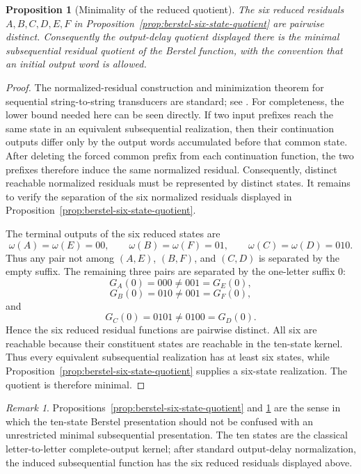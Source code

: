 \documentclass[11pt,letterpaper]{article}
\numberwithin{equation}{section}
\theoremstyle{plain}
\newtheorem{proposition}[theorem]{Proposition}
\theoremstyle{definition}
\theoremstyle{remark}
\newtheorem{remark}[theorem]{Remark}
\begin{document}
\begin{proposition}[Minimality of the reduced quotient]\label{prop:berstel-six-state-minimal}
The six reduced residuals $A,B,C,D,E,F$ in
Proposition~\ref{prop:berstel-six-state-quotient} are pairwise distinct.
Consequently the output-delay quotient displayed there is the minimal
subsequential residual quotient of the Berstel function, with the convention
that an initial output word is allowed.
\end{proposition}

\begin{proof}
The normalized-residual construction and minimization theorem for sequential
string-to-string transducers are standard; see
\cite{Mohri1994MinimizationSequentialTransducers}.  For completeness, the
lower bound needed here can be seen directly.  If two input prefixes reach the
same state in an equivalent subsequential realization, then their continuation
outputs differ only by the output words accumulated before that common state.
After deleting the forced common prefix from each continuation function, the
two prefixes therefore induce the same normalized residual.  Consequently,
distinct reachable normalized residuals must be represented by distinct
states.  It remains to verify the separation of the six normalized residuals
displayed in Proposition~\ref{prop:berstel-six-state-quotient}.

The terminal outputs of the six reduced states are
\[
\omega(A)=\omega(E)=00,\qquad
\omega(B)=\omega(F)=01,\qquad
\omega(C)=\omega(D)=010.
\]
Thus any pair not among $(A,E)$, $(B,F)$, and $(C,D)$ is separated by the
empty suffix.  The remaining three pairs are separated by the one-letter
suffix $0$:
\[
G_A(0)=000 \neq 001=G_E(0),
\]
\[
G_B(0)=010 \neq 001=G_F(0),
\]
and
\[
G_C(0)=0101 \neq 0100=G_D(0).
\]
Hence the six reduced residual functions are pairwise distinct.  All six are
reachable because their constituent states are reachable in the ten-state
kernel.  Thus every equivalent subsequential realization has at least six
states, while Proposition~\ref{prop:berstel-six-state-quotient} supplies a
six-state realization.  The quotient is therefore minimal.
\end{proof}

\begin{remark}
Propositions~\ref{prop:berstel-six-state-quotient} and
\ref{prop:berstel-six-state-minimal} are the sense in which the
ten-state Berstel presentation should not be confused with an unrestricted
minimal subsequential presentation.  The ten states are the classical
letter-to-letter complete-output kernel; after standard output-delay
normalization, the induced subsequential function has the six reduced
residuals displayed above.
\end{remark}
\end{document}
